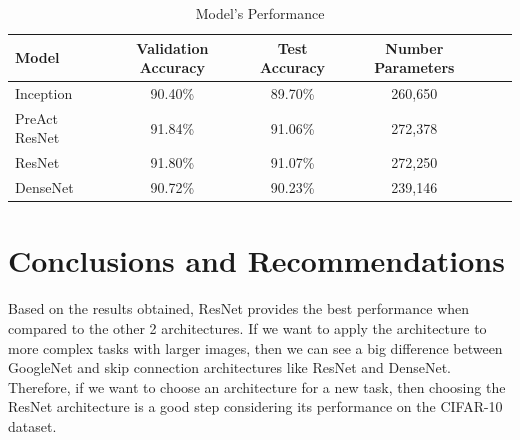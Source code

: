 \documentclass[peerreview]{IEEEtran}
\begin{document}
\begin{table}[H]
\centering
\begin{tabular}{l c c c c c} %
\toprule %
Model & Validation Accuracy & Test Accuracy & Number Parameters \\ %
\midrule %
Inception & 90.40\% & 89.70\% & 260,650 \\ %
PreAct ResNet & 91.84\% & 91.06\% & 272,378 \\ %
ResNet & 91.80\% & 91.07\% & 272,250 \\ %
DenseNet & 90.72\% & 90.23\% & 239,146 \\ %
\midrule %
\midrule %
\end{tabular}
\smallskip 
\caption{Model's Performance} %
\label{tab:model_perform} %
\end{table}

\section{Conclusions and Recommendations}
Based on the results obtained, ResNet provides the best performance when compared to the other 2 architectures. If we want to apply the architecture to more complex tasks with larger images, then we can see a big difference between GoogleNet and skip connection architectures like ResNet and DenseNet. Therefore, if we want to choose an architecture for a new task, then choosing the ResNet architecture is a good step considering its performance on the CIFAR-10 dataset.

\end{document}
